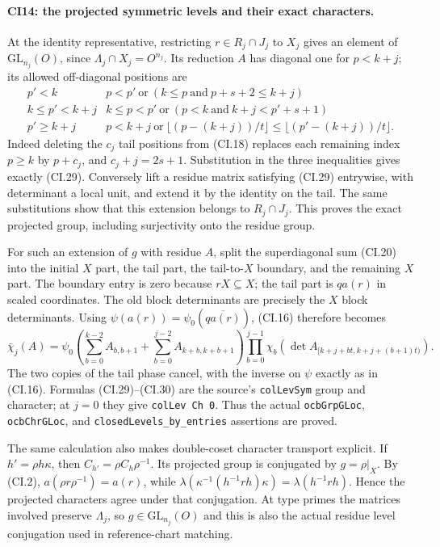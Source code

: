 \paragraph{CI14: the projected symmetric levels and their exact characters.}
At the identity representative, restricting $r\in R_j\cap J_j$
to $X_j$ gives an element of $\mathrm{GL}_{n_j}(O)$, since
$\Lambda_j\cap X_j=O^{n_j}$. Its reduction $A$ has diagonal one
for $p<k+j$; its allowed off-diagonal positions are
\[
\begin{array}{c|l}
 p'<k&p<p'\ \text{or}\ (k\le p\ \text{and}\ p+s+2\le k+j)\\
 k\le p'<k+j&k\le p<p'\ \text{or}\
                     (p<k\ \text{and}\ k+j<p'+s+1)\\
 p'\ge k+j&p<k+j\ \text{or}\
       \lfloor(p-(k+j))/t\rfloor\le
                 \lfloor(p'-(k+j))/t\rfloor.
\end{array}
\tag{CI.29}
\]
Indeed deleting the $c_j$ tail positions from (CI.18) replaces
each remaining index $p\ge k$ by $p+c_j$, and
$c_j+j=2s+1$. Substitution in the three inequalities gives
exactly (CI.29). Conversely lift a residue matrix satisfying
(CI.29) entrywise, with determinant a local unit, and extend it
by the identity on the tail. The same substitutions show that
this extension belongs to $R_j\cap J_j$. This proves the exact
projected group, including surjectivity onto the residue group.

For such an extension of $g$ with residue $A$, split the
superdiagonal sum (CI.20) into the initial $X$ part, the tail
part, the tail-to-$X$ boundary, and the remaining $X$ part.
The boundary entry is zero because $rX\subseteq X$; the tail
part is $q a(r)$ in scaled coordinates. The old block determinants
are precisely the $X$ block determinants. Using
$\psi(a(r))=\psi_0(\overline{q a(r)})$, (CI.16) therefore becomes
\[
 \bar\chi_j(A)=
 \psi_0\!\left(\sum_{b=0}^{k-2}A_{b,b+1}
             +\sum_{b=0}^{j-2}A_{k+b,k+b+1}\right)
 \prod_{b=0}^{j-1}
       \chi_b(\det A_{[k+j+bt,k+j+(b+1)t)}).
 \tag{CI.30}
\]
The two copies of the tail phase cancel, with the inverse
on $\psi$ exactly as in (CI.16). Formulas (CI.29)--(CI.30) are
the source's \texttt{colLevSym} group and character; at $j=0$
they give \texttt{colLev Ch 0}. Thus the actual
\texttt{ocbGrpGLoc}, \texttt{ocbChrGLoc}, and
\texttt{closedLevels\_by\_entries} assertions are proved.

The same calculation also makes double-coset character
transport explicit. If $h'=\rho h\kappa$, then
$C_{h'}=\rho C_h\rho^{-1}$. Its projected group is conjugated
by $g=\rho|_X$. By (CI.2), $a(\rho r\rho^{-1})=a(r)$, while
$\lambda(\kappa^{-1}(h^{-1}rh)\kappa)=\lambda(h^{-1}rh)$.
Hence the projected characters agree under that conjugation.
At type primes the matrices involved preserve $\Lambda_j$, so
$g\in\mathrm{GL}_{n_j}(O)$ and this is also the actual residue
level conjugation used in reference-chart matching.

